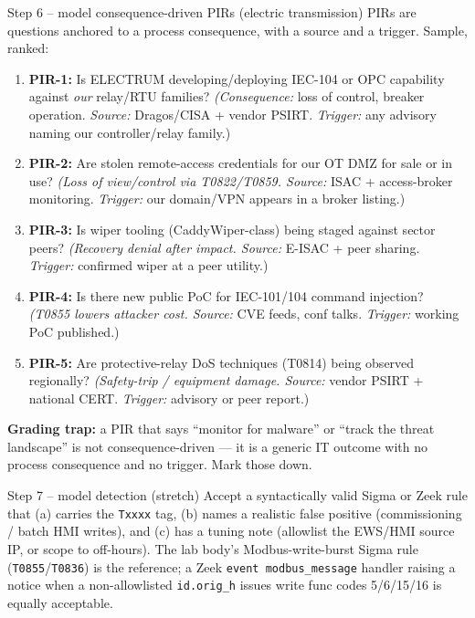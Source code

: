 \documentclass[11pt,a4paper]{article}
\begin{document}
\begin{solutionbox}{Step 6 -- model consequence-driven PIRs (electric transmission)}
PIRs are questions anchored to a process consequence, with a source and a
trigger. Sample, ranked:

\begin{enumerate}[leftmargin=*, nosep]
  \item \textbf{PIR-1:} Is ELECTRUM developing/deploying IEC-104 or OPC
        capability against \emph{our} relay/RTU families? \emph{(Consequence:}
        loss of control, breaker operation. \emph{Source:} Dragos/CISA + vendor
        PSIRT. \emph{Trigger:} any advisory naming our controller/relay family.)
  \item \textbf{PIR-2:} Are stolen remote-access credentials for our OT DMZ for
        sale or in use? \emph{(Loss of view/control via T0822/T0859. Source:}
        ISAC + access-broker monitoring. \emph{Trigger:} our domain/VPN appears
        in a broker listing.)
  \item \textbf{PIR-3:} Is wiper tooling (CaddyWiper-class) being staged against
        sector peers? \emph{(Recovery denial after impact. Source:} E-ISAC +
        peer sharing. \emph{Trigger:} confirmed wiper at a peer utility.)
  \item \textbf{PIR-4:} Is there new public PoC for IEC-101/104 command
        injection? \emph{(T0855 lowers attacker cost. Source:} CVE feeds, conf
        talks. \emph{Trigger:} working PoC published.)
  \item \textbf{PIR-5:} Are protective-relay DoS techniques (T0814) being
        observed regionally? \emph{(Safety-trip / equipment damage. Source:}
        vendor PSIRT + national CERT. \emph{Trigger:} advisory or peer report.)
\end{enumerate}
\textbf{Grading trap:} a PIR that says ``monitor for malware'' or ``track the
threat landscape'' is not consequence-driven --- it is a generic IT outcome with
no process consequence and no trigger. Mark those down.
\end{solutionbox}

\begin{solutionbox}{Step 7 -- model detection (stretch)}
Accept a syntactically valid Sigma or Zeek rule that (a) carries the
\texttt{Txxxx} tag, (b) names a realistic false positive (commissioning /
batch HMI writes), and (c) has a tuning note (allowlist the EWS/HMI source IP,
or scope to off-hours). The lab body's Modbus-write-burst Sigma rule
(\texttt{T0855}/\texttt{T0836}) is the reference; a Zeek
\texttt{event modbus\_message} handler raising a notice when a non-allowlisted
\texttt{id.orig\_h} issues write func codes 5/6/15/16 is equally acceptable.
\end{solutionbox}
\end{document}
